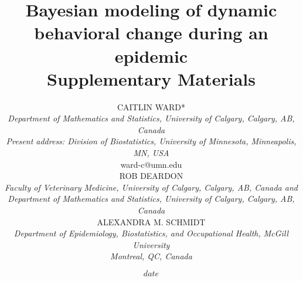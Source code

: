 
\title{\textbf{Bayesian modeling of dynamic behavioral change during an epidemic} \\[8pt]
  \Large Supplementary Materials }

\author{ CAITLIN WARD*\\[3pt]
\small \textit{Department of Mathematics and Statistics, University of Calgary, Calgary, AB, Canada}\\[2pt]
\small \textit{Present address: Division of Biostatistics, University of Minnesota, Minneapolis, MN, USA}\\[2pt]
\small ward-c@umn.edu\\[14pt]
ROB DEARDON\\[3pt]
\small \textit{Faculty of Veterinary Medicine, University of Calgary, Calgary, AB, Canada and} \\[2pt]
\small \textit{Department of Mathematics and Statistics, University of Calgary, Calgary, AB, Canada}\\[14pt]
ALEXANDRA M. SCHMIDT\\[3pt]
\small \textit{Department of Epidemiology, Biostatistics, and Occupational Health, McGill University}\\[2pt]
\small \textit{Montreal, QC, Canada}}


\date{$date$}